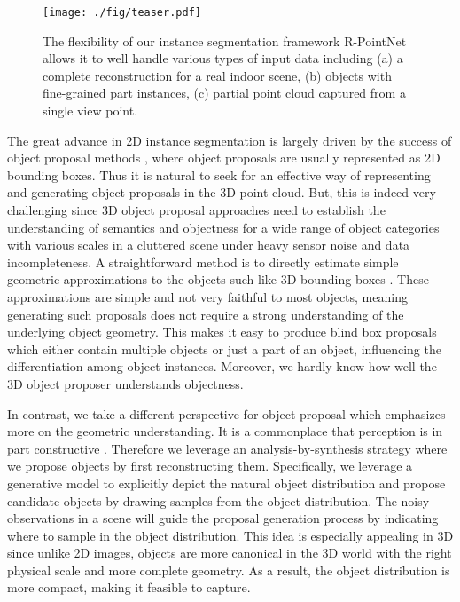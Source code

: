 \documentclass[10pt,twocolumn,letterpaper]{article}
\begin{document}
\begin{figure}[t]
    \centering
    \texttt{[image: ./fig/teaser.pdf]}
    \caption{The flexibility of our instance segmentation framework R-PointNet allows it to well handle various types of input data including (a) a complete reconstruction for a real indoor scene, (b) objects with fine-grained part instances, (c) partial point cloud captured from a single view point.}
    \label{fig:teaser}
    \vspace{-1.5\baselineskip}
\end{figure}

The great advance in 2D instance segmentation is largely driven by the success of object proposal methods \cite{uijlings2013selective}, where object proposals are usually represented as 2D bounding boxes.
Thus it is natural to seek for an effective way of representing and generating object proposals in the 3D point cloud. But, this is indeed very challenging since 3D object proposal approaches need to establish the understanding of semantics and objectness for a wide range of object categories with various scales in a cluttered scene under heavy sensor noise and data incompleteness.
A straightforward method is to directly estimate simple geometric approximations to the objects such like 3D bounding boxes \cite{song2016deep,zhou2017voxelnet}. These approximations are simple and not very faithful to most objects, meaning generating such proposals does not require a strong understanding of the underlying object geometry. This makes it easy to produce blind box proposals which either contain multiple objects or just a part of an object, influencing the differentiation among object instances. Moreover, we hardly know how well the 3D object proposer understands objectness.

In contrast, we take a different perspective for object proposal which emphasizes more on the geometric understanding. It is a commonplace that perception is in part constructive \cite{james1890principles}. Therefore we leverage an analysis-by-synthesis strategy where we propose objects by first reconstructing them. Specifically, we leverage a generative model to explicitly depict the natural object distribution and propose candidate objects by drawing samples from the object distribution. The noisy observations in a scene will guide the proposal generation process by indicating where to sample in the object distribution. This idea is especially appealing in 3D since unlike 2D images, objects are more canonical in the 3D world with the right physical scale and more complete geometry. As a result, the object distribution is more compact, making it feasible to capture.
\end{document}
